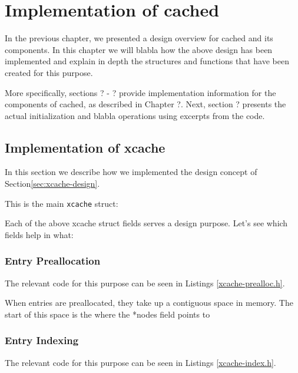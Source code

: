 \chapter{Implementation of cached}\label{ch:cached-implementation}

In the previous chapter, we presented a design overview for cached and its 
components. In this chapter we will blabla how the above design has been
implemented and explain in depth the structures and functions that have been 
created for this purpose.

More specifically, sections ? - ? provide implementation information for the 
components of cached, as described in Chapter ?. Next, section ? presents the 
actual initialization and blabla operations using excerpts from the code.

\section{Implementation of xcache}

In this section we describe how we implemented the design concept of 
Section\ref{sec:xcache-design}.

This is the main \texttt{xcache} struct:


Each of the above xcache struct fields serves a design purpose.
Let's see which fields help in what:

\subsection{Entry Preallocation}

The relevant code for this purpose can be seen in Listings 
\ref{xcache-prealloc.h}.


When entries are preallocated, they take up a contiguous space in memory. The 
start of this space is the where the *nodes field points to 



\subsection{Entry Indexing}

The relevant code for this purpose can be seen in Listings \ref{xcache-index.h}.



